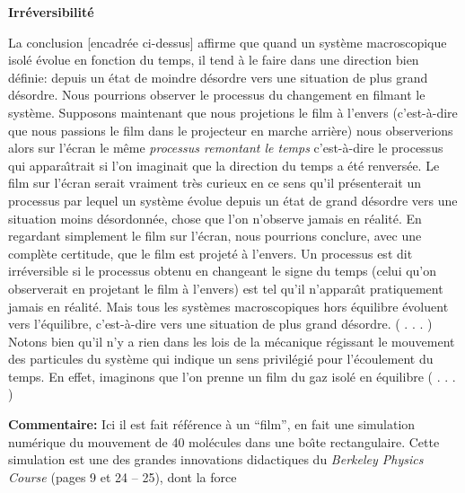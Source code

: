 \medskip
 \centerline{\bf Irr\'eversibilit\'e}
\smallskip
{\cit La conclusion [encadr\'ee ci-dessus] affirme que quand un syst\`eme
macroscopique isol\'e \'evolue en fonction du temps, il tend \`a le faire 
dans une direction bien d\'efinie: depuis un \'etat de moindre d\'esordre 
vers une situation de plus grand d\'esordre. Nous pourrions observer le 
processus du changement en filmant le syst\`eme. Supposons maintenant que 
nous projetions le film \`a l'envers (c'est-\`a-dire que nous passions le 
film dans le projecteur en marche arri\`ere) nous observerions alors sur 
l'\'ecran le m\^eme {\it processus remontant le temps} c'est-\`a-dire le 
processus qui appara{\^\i}trait si l'on imaginait que la direction du temps 
a \'et\'e renvers\'ee. Le film sur l'\'ecran serait vraiment tr\`es curieux 
en ce sens qu'il pr\'esenterait un processus par lequel un syst\`eme \'evolue 
depuis un \'etat de grand d\'esordre vers une situation moins d\'esordonn\'ee, 
chose que l'on n'observe jamais en r\'ealit\'e. En regardant simplement le 
film sur l'\'ecran, nous pourrions conclure, avec une compl\`ete certitude, 
que le film est projet\'e \`a l'envers. 
\smallskip
Un processus est dit irr\'eversible si le processus obtenu en changeant le 
signe du temps (celui qu'on observerait en projetant le film \`a l'envers) 
est tel qu'il n'appara{\^\i}t pratiquement jamais en r\'ealit\'e. Mais tous 
les syst\`emes macroscopiques hors \'equilibre \'evoluent vers l'\'equilibre, 
c'est-\`a-dire vers une situation de plus grand d\'esordre. ( . . . )
\smallskip
Notons bien qu'il n'y a rien dans les lois de la m\'ecanique r\'egissant le 
mouvement des particules du syst\`eme qui indique un sens privil\'egi\'e pour 
l'\'ecoulement du temps. En effet, imaginons que l'on prenne un film du gaz 
isol\'e en \'equilibre ( . . . )\par  }
\medskip
{\bf Commentaire:} Ici il est fait r\'ef\'erence \`a un ``film'', en fait 
une simulation num\'erique du mouvement de 40 mol\'ecules dans une bo{\^\i}te 
rectangulaire. Cette simulation est une des grandes innovations didactiques 
du {\it Berkeley Physics Course} (pages 9 et 24 -- 25), dont la force 
